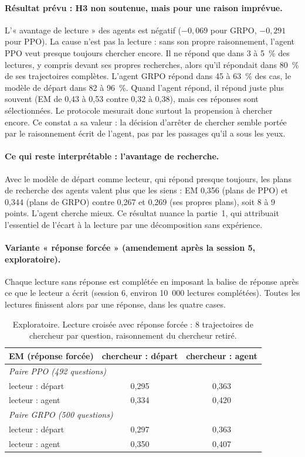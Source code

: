\documentclass[11pt,a4paper]{article}
\begin{document}
\paragraph{Résultat prévu : H3 non soutenue, mais pour une raison imprévue.} L'« avantage de lecture » des agents est négatif ($-0{,}069$ pour GRPO, $-0{,}291$ pour PPO). La cause n'est pas la lecture : sans son propre raisonnement, l'agent PPO veut presque toujours chercher encore. Il ne répond que dans 3 à 5~\% des lectures, y compris devant ses propres recherches, alors qu'il répondait dans 80~\% de ses trajectoires complètes. L'agent GRPO répond dans 45 à 63~\% des cas, le modèle de départ dans 82 à 96~\%. Quand l'agent répond, il répond juste plus souvent (EM de 0,43 à 0,53 contre 0,32 à 0,38), mais ces réponses sont sélectionnées. Le protocole mesurait donc surtout la propension à chercher encore. Ce constat a sa valeur : la décision d'arrêter de chercher semble portée par le raisonnement écrit de l'agent, pas par les passages qu'il a sous les yeux.

\paragraph{Ce qui reste interprétable : l'avantage de recherche.} Avec le modèle de départ comme lecteur, qui répond presque toujours, les plans de recherche des agents valent plus que les siens : EM 0,356 (plans de PPO) et 0,344 (plans de GRPO) contre 0,267 et 0,269 (ses propres plans), soit 8 à 9 points. L'agent cherche mieux. Ce résultat nuance la partie~1, qui attribuait l'essentiel de l'écart à la lecture par une décomposition sans expérience.

\paragraph{Variante « réponse forcée » (amendement après la session 5, exploratoire).} Chaque lecture sans réponse est complétée en imposant la balise de réponse après ce que le lecteur a écrit (session 6, environ 10~000 lectures complétées). Toutes les lectures finissent alors par une réponse, dans les quatre cases.

\begin{table}[h]\centering\small
\begin{tabular}{lcc}\toprule
EM (réponse forcée) & chercheur : départ & chercheur : agent\\\midrule
\multicolumn{3}{l}{\emph{Paire PPO (492 questions)}}\\
lecteur : départ & 0,295 & 0,363\\
lecteur : agent & 0,334 & 0,420\\
\multicolumn{3}{l}{\emph{Paire GRPO (500 questions)}}\\
lecteur : départ & 0,297 & 0,363\\
lecteur : agent & 0,350 & 0,407\\\bottomrule
\end{tabular}
\caption{Exploratoire. Lecture croisée avec réponse forcée : 8 trajectoires de chercheur par question, raisonnement du chercheur retiré.}\label{tab:lecture}
\end{table}
\end{document}

